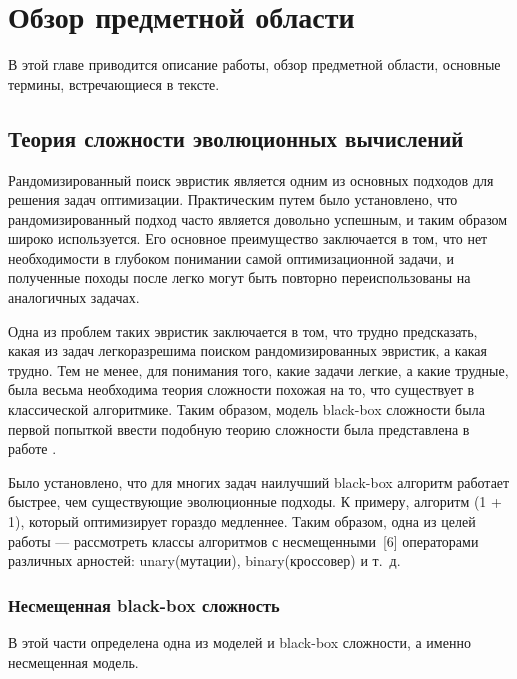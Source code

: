 \chapter{Обзор предметной области}
\label{chapter1}

В этой главе приводится описание работы, обзор предметной области, основные термины, встречающиеся в тексте. 

\section{Теория сложности эволюционных вычислений}
Рандомизированный поиск эвристик является одним из основных подходов для решения задач оптимизации. Практическим путем было установлено, что рандомизированный подход часто является довольно успешным, и таким образом широко используется. Его основное преимущество заключается в том, что нет необходимости в глубоком понимании самой оптимизационной задачи, и полученные походы после легко могут быть повторно переиспользованы на аналогичных задачах.

Одна из проблем таких эвристик заключается в том, что трудно предсказать, какая из задач легкоразрешима поиском рандомизированных эвристик, а какая трудно. Тем не менее, для понимания того, какие задачи легкие, а какие трудные, была весьма необходима теория сложности похожая на то, что существует в классической алгоритмике. Таким образом, модель black-box сложности была первой попыткой ввести подобную теорию сложности была представлена в работе \cite{2}. 


Было установлено, что для многих задач наилучший black-box алгоритм работает быстрее, чем существующие эволюционные подходы. К примеру, алгоритм (1 + 1), который оптимизирует гораздо медленнее. Таким образом, одна из целей работы — рассмотреть классы алгоритмов с несмещенными [6] операторами различных арностей: unary(мутации), binary(кроссовер) и т. д.

\subsection{Несмещенная black-box сложность}
В этой части определена одна из моделей и black-box сложности, а именно несмещенная модель.



